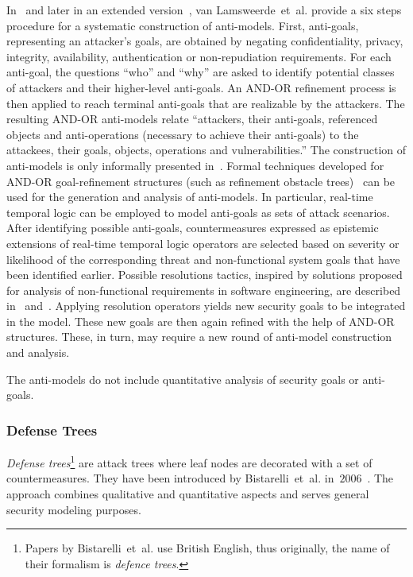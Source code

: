 \documentclass[a4paper]{article}
\begin{document}
In~\cite{LaBrLaJa} and later in an extended version~\cite{Lams}, van
Lamsweerde~et~al. provide a six steps procedure for a systematic construction 
of anti-models. First, anti-goals, representing an attacker's goals, are 
obtained by negating confidentiality, privacy, integrity, availability,
authentication or non-repudiation requirements. For each anti-goal, the
questions ``who'' and ``why'' are asked to identify potential classes of 
attackers and their higher-level anti-goals. An AND-OR refinement process is
then applied to reach terminal anti-goals that are realizable by the attackers. 
The resulting AND-OR anti-models relate ``attackers, their anti-goals, 
referenced objects and anti-operations (necessary to achieve their anti-goals) 
to the attackees, their goals, objects, operations and vulnerabilities.'' The
construction of anti-models is only informally presented in~\cite{LaBrLaJa}.
Formal techniques developed for AND-OR goal-refinement structures (such as
refinement obstacle trees)~\cite{LaLe} can be used for the generation and
analysis of anti-models. In particular, real-time temporal logic can be 
employed to model anti-goals as sets of attack scenarios. After identifying
possible anti-goals, countermeasures expressed as epistemic extensions of
real-time temporal logic operators are selected based on severity or likelihood
of the corresponding threat and non-functional system goals that have been
identified earlier. Possible resolutions tactics, inspired by solutions 
proposed for analysis of non-functional requirements in software engineering, 
are described in~\cite{LaLe} and~\cite{Lams}. Applying resolution operators 
yields new security goals to be integrated in the model. These new goals are
then again refined with the help of AND-OR structures. These, in turn, may
require a new round of anti-model construction and analysis. 

The anti-models do not include quantitative analysis of security goals or
anti-goals. 

\subsubsection{Defense Trees} 
\label{sec:defense_trees}

\emph{Defense trees}\footnote{Papers by Bistarelli~et~al. use British English,
thus originally, the name of their formalism is \emph{defence trees}.} are
attack trees where leaf nodes are decorated with a set of countermeasures.
They have been introduced by Bistarelli~et~al. in~$2006$~\cite{BiFiPe}. The
approach combines qualitative and quantitative aspects and serves general
security modeling purposes.
\end{document}
